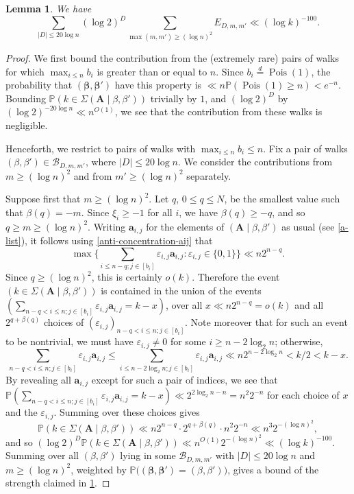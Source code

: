 \documentclass[11pt,reqno]{amsart}
\numberwithin{equation}{section}
\newtheorem{lemma}[theorem]{Lemma}
\theoremstyle{definition}
\theoremstyle{remark}
\newcommand{\mb}{\mathbb}
\newcommand{\mbf}{\mathbf}
\newcommand{\eps}{\varepsilon}
\newcommand\Pois{\operatorname{Pois}}
\def\boldbeta{\boldsymbol\beta}
\renewcommand{\le}{\leqslant}
\renewcommand{\ge}{\geqslant}
\newcommand\samedist{\overset{d}{=}}
\begin{document}
\begin{lemma}\label{lem102}
We have 
\[ \sum_{|D| \le 20 \log n}(\log 2)^D \sum_{\max(m, m') \ge (\log n)^2} E_{D,m,m'} \ll (\log k)^{-100}.\]
\end{lemma}
\begin{proof} 
We first bound the contribution from the (extremely rare) pairs of walks for which $\max_{i \le n} b_i$ is greater than or equal to $n$. Since $b_i \samedist \Pois(1)$, the probability that $(\boldbeta,\boldbeta')$ have this property is $\ll n \mb{P}(\Pois(1) \ge n) < e^{-n}$.  Bounding $\mb{P}(k \in \Sigma(\mbf{A} \mid \beta,\beta'))$ trivially by $1$, and $(\log 2)^{D}$ by $(\log 2)^{- 20 \log n} \ll n^{O(1)}$, we see that the contribution from these walks is negligible.

Henceforth, we restrict to pairs of walks with $\max_{i \le n} b_i \le n$. Fix a pair of walks $(\beta,\beta') \in \mathscr{B}_{D,m,m'}$, where $|D| \le 20 \log n$. We consider the contributions from $m \ge (\log n)^2$ and from $m' \ge (\log n)^2$ separately.

Suppose first that $m \ge (\log n)^2$. Let $q$, $0 \le q \le N$, be the smallest value such that $\beta(q) = -m$. Since $\xi_i \ge -1$ for all $i$, we have $\beta(q) \ge -q$, and so $q \ge m \ge (\log n)^2$. Writing $\mbf{a}_{i,j}$ for the elements of $(\mbf{A} \mid \beta,\beta')$ as usual (see \cref{a-list}), it follows using \cref{anti-concentration-aij} that 
\begin{equation*}\max \{ \sum_{i \le n - q; j \in [b_i]} \eps_{i,j} \mbf{a}_{i,j} : \eps_{i,j} \in \{0,1\}\} \ll n 2^{n - q} . \end{equation*} Since $q \ge (\log n)^2$, this is certainly $o(k)$.
Therefore the event $(k \in \Sigma(\mbf{A} \mid \beta,\beta'))$ is contained in the union of the events $(\sum_{n  - q < i \le n; j \in [b_i]} \eps_{i,j} \mbf{a}_{i,j} = k - x)$, over all $x \ll n 2^{n - q} = o(k)$ and all $2^{q + \beta(q)}$ choices of $(\eps_{i,j})_{n - q < i \le n; j \in [b_i]}$. Note moreover that for such an event to be nontrivial, we must have $\eps_{i,j} \ne 0$ for some $i \ge n - 2 \log_2 n$; otherwise, 
\[ \sum_{n - q < i \le n;j \in [b_i]} \eps_{i,j} \mbf{a}_{i,j} \le \sum_{i \le n - 2 \log_2 n; j \in [b_i] } \eps_{i,j} \mbf{a}_{i,j} \ll n2^{n - 2 \log_2 n} < k/2 < k - x.\] By revealing all $\mbf{a}_{i,j}$ except for such a pair of indices, we see that $\mb{P} (\sum_{n - q < i \le n; j \in [b_i]} \eps_{i,j} \mbf{a}_{i,j} = k - x) \ll 2^{2 \log_2 n - n} = n^2 2^{-n}$ for each choice of $x$ and the $\eps_{i,j}$. Summing over these choices gives
\[ \mb{P}(k \in \Sigma(\mbf{A} \mid \beta,\beta')) \ll n 2^{n - q} \cdot 2^{q + \beta(q)} \cdot n^2 2^{-n} \ll n^3 2^{-(\log n)^2},\] and so $(\log 2)^D \mb{P}(k \in \Sigma(\mbf{A} \mid \beta,\beta')) \ll n^{O(1)} 2^{-(\log n)^2} \ll (\log k)^{-100}$.
Summing over all $(\beta,\beta')$ lying in some $\mathscr{B}_{D, m, m'}$ with $|D| \le 20 \log n$ and $m \ge (\log n)^2$, weighted by $\mb{P}\big((\boldbeta, \boldbeta') = (\beta, \beta')\big)$, gives a bound of the strength claimed in \cref{lem102}.


\end{proof}
\end{document}
